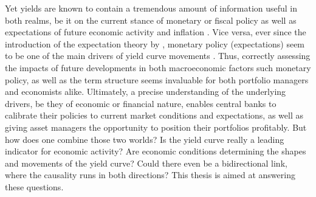 Yet yields are known to contain a tremendous amount of information useful in both realms, be it on the current stance of monetary or fiscal policy as well as expectations of future economic activity and inflation \citep{evans2007economic}. Vice versa, ever since the introduction of the expectation theory by \citet{hicks1946value},
monetary policy (expectations) seem to be one of the main drivers of yield curve movements \citep{evans1998monetary}. Thus, correctly assessing the impacts of future developments in both macroeconomic factors such monetary policy, as well as the term structure seems invaluable for both portfolio managers and economists alike.
Ultimately, a precise understanding of the underlying drivers, be they of economic or financial nature, enables central banks to calibrate their policies to current market conditions and expectations, as well as giving asset managers the opportunity to position their portfolios profitably. 
But how does one combine those two worlds?
Is the yield curve really a leading indicator for economic activity?
Are economic conditions determining the shapes and movements of the yield curve?
Could there even be a bidirectional link, where the causality runs in both directions?
This thesis is aimed at answering these questions.

